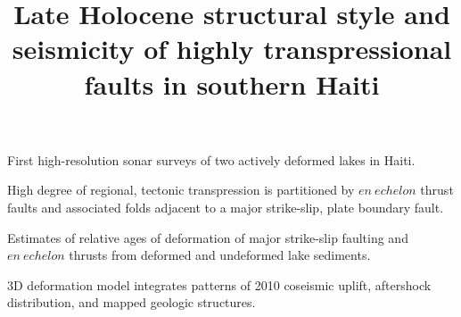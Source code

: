 \documentclass[linenumbers,draft]{agujournal}
\begin{document}
\title{Late Holocene structural style and seismicity of highly transpressional faults in southern Haiti}



\begin{keypoints}
\item First high-resolution sonar surveys of two actively deformed lakes in Haiti.
\item High degree of regional, tectonic transpression is partitioned by $en~echelon$ thrust faults and associated folds adjacent to a major strike-slip, plate boundary fault.
\item Estimates of relative ages of deformation of major strike-slip faulting and $en~echelon$ thrusts from deformed and undeformed lake sediments.
\item 3D deformation model integrates patterns of 2010 coseismic uplift, aftershock distribution, and mapped geologic structures.
\end{keypoints}
\end{document}
